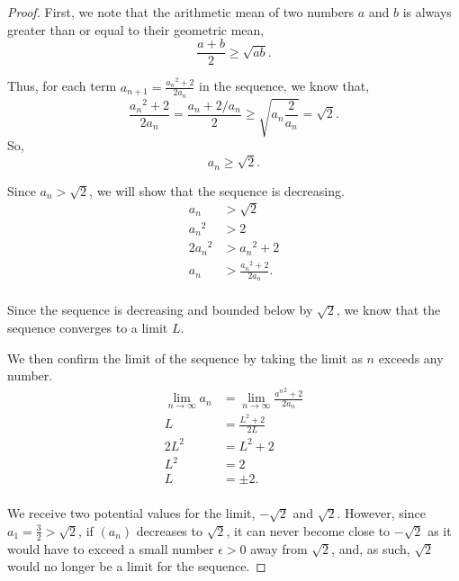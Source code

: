 \documentclass{article}
\begin{document}
\begin{proof}
First, we note that the arithmetic mean of two numbers $a$ and $b$ is always greater than or equal to their geometric mean, \[\frac{a+b}{2}\geq\sqrt{ab}.\]

Thus, for each term $a_{n+1}=\frac{{a_n}^2+2}{2a_n}$ in the sequence, we know that, \[\frac{{a_n}^2+2}{2a_n}=\frac{a_n+2/a_n}{2}\geq\sqrt{a_n \frac{2}{a_n}}=\sqrt{2}.\]
So, \[a_n\geq\sqrt{2}.\]






Since $a_n>\sqrt{2}$, we will show that the sequence is decreasing.
\begin{align*}
    a_n&>\sqrt{2}\\
    {a_n}^2&>2\\
    2{a_n}^2&>{a_n}^2+2\\
    {a_n}&>\frac{{a_n}^2+2}{2a_n}.\\
\end{align*}

Since the sequence is decreasing and bounded below by $\sqrt{2}$, we know that the sequence converges to a limit $L$.

We then confirm the limit of the sequence by taking the limit as $n$ exceeds any number.
\begin{align*}
    \lim\limits_{n\to\infty}a_n &= \lim\limits_{n\to\infty} \frac{{a^n}^2+2}{2a_n}\\
    L &= \frac{L^2+2}{2L}\\
    2L^2 &= L^2+2\\
    L^2 &= 2\\
    L &= \pm 2.\\
\end{align*}

We receive two potential values for the limit, $-\sqrt{2}$ and $\sqrt{2}$. However, since $a_1=\frac{3}{2}>\sqrt{2}$, if $(a_n)$ decreases to $\sqrt{2}$, it can never become close to $-\sqrt{2}$ as it would have to exceed a small number $\epsilon>0$ away from $\sqrt{2}$, and, as such, $\sqrt{2}$ would no longer be a limit for the sequence.

\end{proof}
\end{document}
